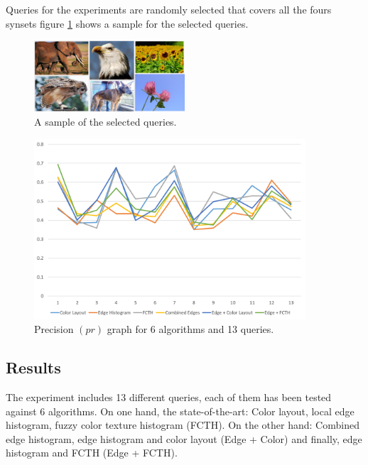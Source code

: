 \documentclass[11pt]{article}
\begin{document}
Queries for the experiments are randomly selected that covers all the fours synsets figure \ref{fig:queries} shows a sample for the selected queries.

\begin{figure}[h]
\centering
\includegraphics[width=0.5\textwidth]{queries}
\caption{A sample of the selected queries.}
\label{fig:queries}
\end{figure}

\begin{figure}[h]
\centering
\includegraphics[width=0.9\textwidth]{PrResults}
\caption{ Precision $(pr)$ graph for 6 algorithms and 13 queries.}
\label{fig:PrResults}
\end{figure}

\subsection{Results}

The experiment includes 13 different queries, each of them has been tested against 6 algorithms. On one hand, the state-of-the-art: Color layout, local edge histogram, fuzzy color texture histogram (FCTH). On the other hand: Combined edge histogram, edge histogram and color layout (Edge + Color) and  finally, edge histogram and FCTH (Edge + FCTH).
\end{document}
